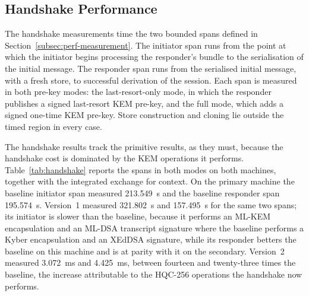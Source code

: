 \subsection{Handshake Performance}
\label{subsec:handshake-results}

The handshake measurements time the two bounded spans defined in Section~\ref{subsec:perf-measurement}. The initiator span runs from the point at which the initiator begins processing the responder's bundle to the serialisation of the initial message. The responder span runs from the serialised initial message, with a fresh store, to successful derivation of the session. Each span is measured in both pre-key modes: the last-resort-only mode, in which the responder publishes a signed last-resort KEM pre-key, and the full mode, which adds a signed one-time KEM pre-key. Store construction and cloning lie outside the timed region in every case.

The handshake results track the primitive results, as they must, because the handshake cost is dominated by the KEM operations it performs. Table~\ref{tab:handshake} reports the spans in both modes on both machines, together with the integrated exchange for context. On the primary machine the baseline initiator span measured 213.549~\textmu s and the baseline responder span 195.574~\textmu s. Version~1 measured 321.802~\textmu s and 157.495~\textmu s for the same two spans; its initiator is slower than the baseline, because it performs an ML-KEM encapsulation and an ML-DSA transcript signature where the baseline performs a Kyber encapsulation and an XEdDSA signature, while its responder betters the baseline on this machine and is at parity with it on the secondary. Version~2 measured 3.072~ms and 4.425~ms, between fourteen and twenty-three times the baseline, the increase attributable to the HQC-256 operations the handshake now performs.


